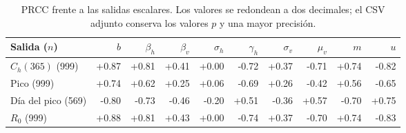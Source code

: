\begin{table}[!htbp]\centering
\caption{PRCC frente a las salidas escalares. Los valores se redondean a dos decimales; el CSV adjunto conserva los valores $p$ y una mayor precisión.}\label{tab:prcc}
\setlength{\tabcolsep}{3pt}\footnotesize
\begin{tabular}{lrrrrrrrrr}\toprule
Salida ($n$) & $b$ & $\beta_h$ & $\beta_v$ & $\sigma_h$ & $\gamma_h$ & $\sigma_v$ & $\mu_v$ & $m$ & $u$\\\midrule
$C_h(365)$ (999) & +0.87 & +0.81 & +0.41 & +0.00 & -0.72 & +0.37 & -0.71 & +0.74 & -0.82\\
Pico (999) & +0.74 & +0.62 & +0.25 & +0.06 & -0.69 & +0.26 & -0.42 & +0.56 & -0.65\\
Día del pico (569) & -0.80 & -0.73 & -0.46 & -0.20 & +0.51 & -0.36 & +0.57 & -0.70 & +0.75\\
$R_0$ (999) & +0.88 & +0.81 & +0.43 & +0.00 & -0.74 & +0.37 & -0.70 & +0.74 & -0.83\\
\bottomrule\end{tabular}\end{table}
